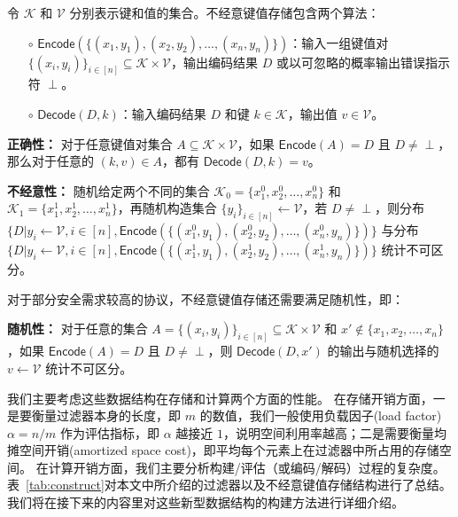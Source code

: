 \begin{definition}[不经意键值存储]\label{def:okvs}
    令 $\mathcal{K}$ 和 $\mathcal{V}$ 分别表示键和值的集合。不经意键值存储包含两个算法：
    \begin{itemize}
        \item[$\circ$] $\mathsf{Encode}(\{(x_1, y_1), (x_2, y_2), \dots, (x_n, y_n)\})$：输入一组键值对 $\{(x_i, y_i)\}_{i\in [n]}\subseteq \mathcal{K} \times \mathcal{V}$，输出编码结果 $D$ 或以可忽略的概率输出错误指示符 $\perp$。
        \item[$\circ$] $\mathsf{Decode}(D, k)$：输入编码结果 $D$ 和键 $k\in \mathcal{K}$，输出值 $v\in \mathcal{V}$。
    \end{itemize}

    \textbf{正确性：} 对于任意键值对集合 $A\subseteq \mathcal{K}\times \mathcal{V}$，如果 $\mathsf{Encode}(A) = D$ 且 $D\neq \perp$，那么对于任意的 $(k, v) \in A$，都有 $\mathsf{Decode}(D, k) = v$。

    \textbf{不经意性：} 随机给定两个不同的集合 $\mathcal{K}_0 = \{x_1^0, x_2^0, \dots, x_n^0\}$ 和 $\mathcal{K}_1 = \{x_1^1, x_2^1, \dots, x_n^1\}$，再随机构造集合 $\{y_i\}_{i\in [n]}\gets \mathcal{V}$，若 $D \neq \perp$，则分布 $\{D | y_i \gets \mathcal{V}, i\in [n], \mathsf{Encode}(\{(x_1^0, y_1), (x_2^0, y_2), \dots, (x_n^0, y_n)\})\}$ 与分布 $\{D | y_i \gets \mathcal{V}, i\in [n], \mathsf{Encode}(\{(x_1^1, y_1), (x_2^1, y_2), \dots, (x_n^1, y_n)\})\}$ 统计不可区分。

    对于部分安全需求较高的协议，不经意键值存储还需要满足随机性，即：

    \textbf{随机性：} 对于任意的集合 $A = \{(x_i, y_i)\}_{i\in [n]} \subseteq \mathcal{K} \times \mathcal{V}$ 和 $x' \notin \{x_1, x_2, \dots, x_n\}$，如果 $\mathsf{Encode}(A) = D$ 且 $D\neq \perp$，则 $\mathsf{Decode}(D, x')$ 的输出与随机选择的 $v\gets \mathcal{V}$ 统计不可区分。
\end{definition}

我们主要考虑这些数据结构在存储和计算两个方面的性能。
在存储开销方面，一是要衡量过滤器本身的长度，即 $m$ 的数值，我们一般使用负载因子(load factor) $\alpha = n/m$ 作为评估指标，即 $\alpha$ 越接近 $1$，说明空间利用率越高；二是需要衡量均摊空间开销(amortized space cost)，即平均每个元素上在过滤器中所占用的存储空间。
在计算开销方面，我们主要分析构建/评估（或编码/解码）过程的复杂度。
表~\ref{tab:construct}对本文中所介绍的过滤器以及不经意键值存储结构进行了总结。
我们将在接下来的内容里对这些新型数据结构的构建方法进行详细介绍。

